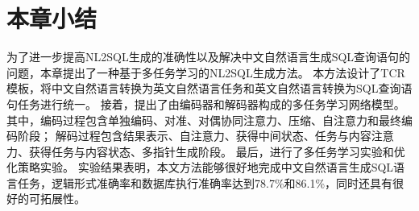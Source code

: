 \section{本章小结}

为了进一步提高NL2SQL生成的准确性以及解决中文自然语言生成SQL查询语句的问题，本章提出了一种基于多任务学习的NL2SQL生成方法。
本方法设计了TCR模板，将中文自然语言转换为英文自然语言任务和英文自然语言转换为SQL查询语句任务进行统一。
接着，提出了由编码器和解码器构成的多任务学习网络模型。
其中，编码过程包含单独编码、对准、对偶协同注意力、压缩、自注意力和最终编码阶段；
解码过程包含结果表示、自注意力、获得中间状态、任务与内容注意力、获得任务与内容状态、多指针生成阶段。
最后，进行了多任务学习实验和优化策略实验。
实验结果表明，本文方法能够很好地完成中文自然语言生成SQL语言任务，逻辑形式准确率和数据库执行准确率达到78.7\%和86.1\%，同时还具有很好的可拓展性。

